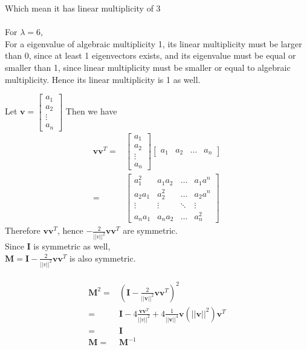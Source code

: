 \documentclass[12pt]{article}
\newcommand{\matr}[1]{\bm{#1}}
\newenvironment{answer}[2][Answer]{\begin{trivlist}
    \item[\hskip \labelsep {\bfseries #1}\hskip \labelsep {\bfseries #2.}]}{\end{trivlist}}
\begin{document}
Which mean it has linear multiplicity of 3\\ \\
For $\lambda=6$, \\
For a eigenvalue of algebraic multiplicity 1, its linear multiplicity must be larger than 0, since at least 1 eigenvectors exists, and its eigenvalue must be equal or smaller than 1, since linear multiplicity must be smaller or equal to algebraic multiplicity. Hence its linear multiplicity is 1 as well.

\begin{answer}{Q. 5}\end{answer}
Let $\matr v = \begin{bmatrix}
a_1 \\ a_2 \\ \vdots \\ a_n
\end{bmatrix}$
Then we have
\begin{align}
    \matr v \matr v ^T =&\begin{bmatrix}
a_1 \\ a_2 \\ \vdots \\ a_n
\end{bmatrix} \begin{bmatrix}
a_1 & a_2 & \hdots & a_n
\end{bmatrix} \\
=&\begin{bmatrix}
a_1^2 & a_1  a_2 & \hdots & a_1 a^ n \\
a_2 a_1 &   a_2^2 & \hdots & a_2 a^ n \\
\vdots & \vdots & \ddots & \vdots \\
a_n a_1 & a_n a_2 & \hdots & a_n^2
\end{bmatrix}
\end{align}
Therefore $\matr v \matr v ^T$, hence $-\frac 2 {||v||^2} \matr v \matr v ^T$ are symmetric. \\
Since $\matr I$ is symmetric as well, \\
$\matr M = \matr I -\frac 2 {||v||^2} \matr v \matr v ^T $ is also symmetric. \\ \\
\begin{align}
    \matr M^2 =& (\matr I -\frac 2 {||\matr v||^2} \matr v \matr v ^T)^2 \\
    =& \matr I - 4 \frac {\matr v \matr v ^T}{||v||^2} + 4 \frac 1 {||\matr v||^4} \matr v (||\matr v||^2) \matr v ^T \\
    =& \matr I \\
    \matr M =& \matr M ^{-1}
\end{align}
\end{document}
